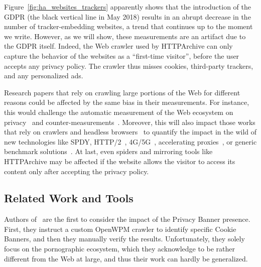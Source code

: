 Figure~\ref{fig:ha_websites_trackers} apparently shows that the introduction of the GDPR (the black vertical line in May 2018) results in an abrupt decrease in the number of tracker-embedding websites, a trend that continues up to the moment we write. However, as we will show, these measurements are an artifact due to the GDPR itself. Indeed, the Web crawler used by HTTPArchive can only capture the behavior of the websites as a ``first-time visitor'', before the user accepts any privacy policy. The crawler thus misses cookies, third-party trackers, and any personalized ads.

Research papers that rely on crawling large portions of the Web for different reasons could be affected by the same bias in their measurements. For instance, this would challenge the automatic measurement of the Web ecosystem on privacy~\cite{acar2014web,falahrastegar2014rise,metwalley2015online,pujol2015annoyed,englehardt2016online,iordanou2018tracing,hu2019characterising,rizzo2021unveiling,vandrevu2019what,papadogiannakis2021user,aqeel2020on} and counter-measurements~\cite{pujol2015annoyed, traverso2017benchmark, mazel2019comparison}. Moreover, this will also impact those works that rely on crawlers and headless browsers~\cite{avasarala2014selenium} to quantify the impact in the wild of new technologies like SPDY,  HTTP/2~\cite{wang2014speedy,de2015http,bocchi2016measuring,erman2015towards}, 4G/5G~\cite{alay2017experience,asrese2019measuring}, accelerating proxies~\cite{sivakumar2014parcel,wang2016speeding,ruamviboonsuk2017vroom}, or generic benchmark solutions~\cite{netravali2015mahimahi}. At last, even spiders and mirroring tools like HTTPArchive may be affected if the website allows the visitor to access its content only after accepting the privacy policy.



\subsection{Related Work and Tools}

Authors of~\cite{vallina2019tales} are the first to consider the impact of the Privacy Banner presence. First, they instruct a custom OpenWPM crawler to identify specific Cookie Banners, and then they manually verify the results. Unfortunately, they solely focus on the pornographic ecosystem, which they acknowledge to be rather different from the Web at large, and thus their work can hardly be generalized.

